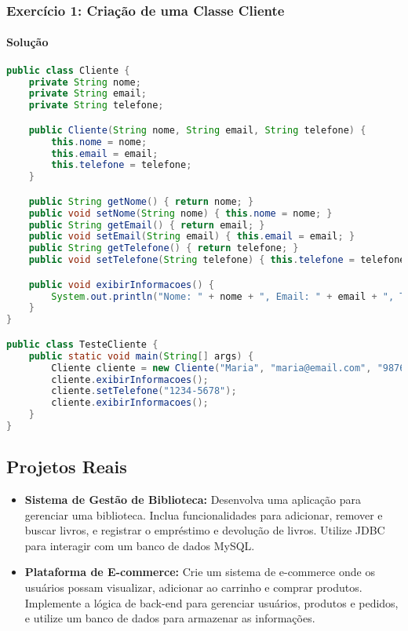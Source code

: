 \documentclass[a4paper,12pt]{book}
\begin{document}
\subsubsection{Exercício 1: Criação de uma Classe Cliente}
\paragraph{Solução}
\begin{lstlisting}[language=Java]
public class Cliente {
    private String nome;
    private String email;
    private String telefone;

    public Cliente(String nome, String email, String telefone) {
        this.nome = nome;
        this.email = email;
        this.telefone = telefone;
    }

    public String getNome() { return nome; }
    public void setNome(String nome) { this.nome = nome; }
    public String getEmail() { return email; }
    public void setEmail(String email) { this.email = email; }
    public String getTelefone() { return telefone; }
    public void setTelefone(String telefone) { this.telefone = telefone; }

    public void exibirInformacoes() {
        System.out.println("Nome: " + nome + ", Email: " + email + ", Telefone: " + telefone);
    }
}

public class TesteCliente {
    public static void main(String[] args) {
        Cliente cliente = new Cliente("Maria", "maria@email.com", "9876-5432");
        cliente.exibirInformacoes();
        cliente.setTelefone("1234-5678");
        cliente.exibirInformacoes();
    }
}
\end{lstlisting}

\subsection{Projetos Reais}

\begin{itemize}
    \item \textbf{Sistema de Gestão de Biblioteca:} Desenvolva uma aplicação para gerenciar uma biblioteca. Inclua funcionalidades para adicionar, remover e buscar livros, e registrar o empréstimo e devolução de livros. Utilize JDBC para interagir com um banco de dados MySQL.
    \item \textbf{Plataforma de E-commerce:} Crie um sistema de e-commerce onde os usuários possam visualizar, adicionar ao carrinho e comprar produtos. Implemente a lógica de back-end para gerenciar usuários, produtos e pedidos, e utilize um banco de dados para armazenar as informações.
\end{itemize}
\end{document}
